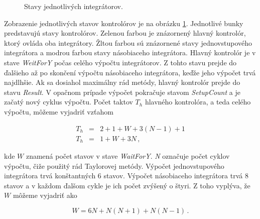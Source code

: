 \bigskip
\begin{figure}[h]
\centering
{}
\caption{Stavy jednotlivých integrátorov.}
\label{stavyimg}
\end{figure}

Zobrazenie jednotlivých stavov kontrolórov je na obrázku \ref{stavyimg}. Jednotlivé bunky predstavujú stavy kontrolórov. Zelenou farbou je znázornený hlavný kontrolór, ktorý ovláda oba integrátory. Žltou farbou sú znázornené stavy jednovstupového integrátora a modrou farbou stavy násobiaceho integrátora. Hlavný kontrolór je v stave \textit{WeitForY} počas celého výpočtu integrátorov. Z tohto stavu prejde do ďalšieho až po skončení výpočtu násobiaceho integrátora, keďže jeho výpočet trvá najdlhšie. Ak sa dosiahol maximálny rád metódy, hlavný kontrolór prejde do stavu \textit{Result}. V opačnom prípade výpočet pokračuje stavom \textit{SetupCount} a je začatý nový cyklus výpočtu. Počet taktov $ T_h $ hlavného kontrolóra, a teda celého výpočtu, môžeme vyjadriť vzťahom

\begin{eqnarray}
T_h & = & 2 + 1 + W + 3(N-1) + 1 \nonumber \\
T_h & = & 1 + W + 3N \, ,
\end{eqnarray}

kde $ W $ znamená počet stavov v stave \textit{WaitForY}. \textit{N} označuje počet cyklov výpočtu, čiže použitý rád Taylorovej metódy.
Výpočet jednovstupového integrátora trvá konštantných 6 stavov. Výpočet násobiaceho integrátora trvá 8 stavov a v každom ďalšom cykle je ich počet zvýšený o štyri. Z toho vyplýva, že $ W $ môžeme vyjadriť ako

\begin{equation}
W = 6N + N(N+1) + N(N-1) \, .
\end{equation}
\bigskip

